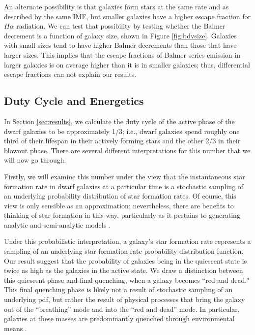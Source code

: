 \documentclass[iop]{emulateapj}
\begin{document}
An alternate possibility is that galaxies form stars at the same rate and as described by the same IMF, but smaller galaxies have a higher escape fraction for $H\alpha$ radiation. We can test that possibility by testing whether the Balmer decrement is a function of galaxy size, shown in Figure \ref{fig:bdvsize}. Galaxies with small sizes tend to have higher Balmer decrements than those that have larger sizes. This implies that the escape fractions of Balmer series emission in larger galaxies is on average higher than it is in smaller galaxies; thus, differential escape fractions can not explain our results.

\subsection{Duty Cycle and Energetics}

In Section \ref{sec:results}, we calculate the duty cycle of the active phase of the dwarf galaxies to be approximately 1/3; i.e., dwarf galaxies spend roughly one third of their lifespan in their actively forming stars and the other 2/3 in their blowout phase. There are several different interpretations for this number that we will now go through.

Firstly, we will examine this number under the view that the instantaneous star formation rate in dwarf galaxies at a particular time is a stochastic sampling of an underlying probability distribution of star formation rates. Of course, this view is only sensible as an approximation; nevertheless, there are benefits to thinking of star formation in this way, particularly as it pertains to generating analytic and semi-analytic models \citep{Kelson16}. 

Under this probabilistic interpretation, a galaxy's star formation rate represents a sampling of an underlying star formation rate probability distribution function. Our result suggest that the probability of galaxies being in the quiescent state is twice as high as the galaxies in the active state. We draw a distinction between this quiescent phase and final quenching, when a galaxy becomes ``red and dead." This final quenching phase is likely not a result of stochastic sampling of an underlying pdf, but rather the result of physical processes that bring the galaxy out of the ``breathing'' mode and into the ``red and dead'' mode. In particular, galaxies at these masses are predominantly quenched through environmental means \citep{geha12}.
\end{document}
